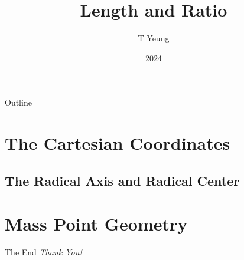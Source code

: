 \documentclass{beamer}
\title{Length and Ratio}
\author{T Yeung}
\institute{THMSS}
\date{2024}
\begin{document}
\setlength{\abovedisplayskip}{3pt}
\setlength{\belowdisplayskip}{3pt}

\frame{\titlepage}
\begin{frame}{Outline}
	\tableofcontents[pausesections]
\end{frame}

\section{The Cartesian Coordinates}
\subsection{The Radical Axis and Radical Center}
\section{Mass Point Geometry}

\begin{frame}{The End}
\centering \Large
\emph{Thank You!}
\end{frame}
\end{document}
